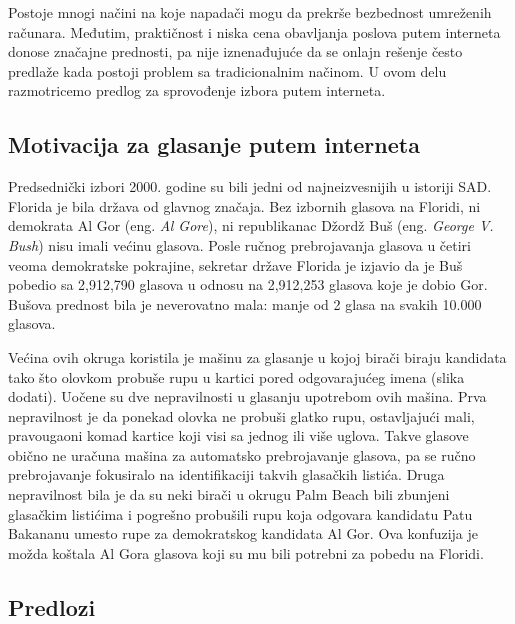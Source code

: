\documentclass[a4paper]{article}
\begin{document}
Postoje mnogi načini na koje napadači mogu da prekrše bezbednost umreženih računara. Međutim, praktičnost i niska cena obavljanja poslova putem interneta donose značajne prednosti, pa nije iznenađujuće da se onlajn rešenje često predlaže kada postoji problem sa tradicionalnim načinom. U ovom delu razmotricemo predlog za sprovođenje izbora putem interneta.

\subsection{Motivacija za glasanje putem interneta}
\label{subsec:Motivacija za glasanje putem interneta}

Predsednički izbori 2000. godine su bili jedni od najneizvesnijih u istoriji SAD. Florida je bila država od glavnog značaja. Bez izbornih glasova na Floridi, ni demokrata Al Gor (eng. {\em Al Gore}), ni republikanac Džordž Buš (eng. {\em George V. Bush}) nisu imali većinu glasova. Posle ručnog prebrojavanja glasova u četiri veoma demokratske pokrajine, sekretar države Florida je izjavio da je Buš pobedio sa 2,912,790 glasova u odnosu na 2,912,253 glasova koje je dobio Gor. Bušova prednost bila je neverovatno mala: manje od 2 glasa na svakih 10.000 glasova.

Većina ovih okruga koristila je mašinu za glasanje u kojoj birači biraju kandidata tako što olovkom probuše rupu u kartici pored odgovarajućeg imena (slika dodati). Uočene su dve nepravilnosti u glasanju upotrebom ovih mašina. Prva nepravilnost je da ponekad olovka ne probuši glatko rupu, ostavljajući mali, pravougaoni komad kartice koji visi sa jednog ili više uglova. Takve glasove obično ne uračuna mašina za automatsko prebrojavanje glasova, pa se ručno prebrojavanje fokusiralo na identifikaciji takvih glasačkih listića. Druga nepravilnost bila je da su neki birači u okrugu Palm Beach bili zbunjeni glasačkim listićima i pogrešno probušili rupu koja odgovara kandidatu Patu Bakananu umesto rupe za demokratskog kandidata Al Gor. Ova konfuzija je možda koštala Al Gora glasova koji su mu bili potrebni za pobedu na Floridi.

\subsection{Predlozi}
\label{subsec:Predlozi}
\end{document}
